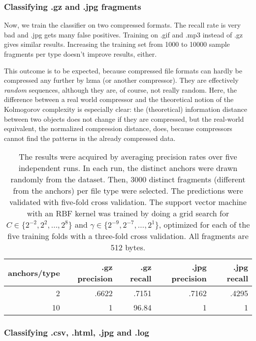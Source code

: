 \subsubsection{Classifying .gz and .jpg fragments}

Now, we train the classifier on two compressed formats. The recall rate is
very bad and .jpg gets many false positives. Training on .gif and .mp3
instead of .gz gives similar results. Increasing the training set from 1000 to 10000 sample fragments per type doesn't improve results, either.

This outcome is to be expected, because compressed file formats can hardly be compressed any further by lzma (or another compressor). They are effectively \emph{random} sequences, although they are, of course, not really random. Here, the difference between a real world compressor and the theoretical notion of the Kolmogorov complexity is especially clear: the (theoretical) information distance between two objects does not change if they are compressed, but the real-world equivalent, the normalized compression distance, does, because compressors cannot find the patterns in the already compressed data.

\begin{table}[h]
\begin{tabular}{rrrrr}
\hline
   anchors/type &   .gz precision &   .gz recall &   .jpg precision &   .jpg recall \\
\hline
              2 &           .6622 &           .7151 &    .7162 &    .4295 \\
             10 &           1     &           96.84 &    1     &    1     \\
\hline
\end{tabular}
\caption{
The results were acquired by averaging precision rates over five
independent runs. In each run, the distinct anchors were drawn randomly from the dataset.
Then, 3000 distinct fragments (different from the anchors) per file type were selected.
The predictions were validated with five-fold cross validation.
The support vector machine with an RBF kernel was trained by doing a grid search
for $C \in \{ 2^{-2}, 2^{2}, \dots, 2^{8} \}$ and $\gamma \in \{2^{-9},
2^{-7}, \dots, 2^{1} \}$, optimized for each of the five training folds with a three-fold
cross validation. All fragments are 512 bytes.} \label{table:gz_jpg_recall}
\end{table}



\subsubsection{Classifying .csv, .html, .jpg and .log}

